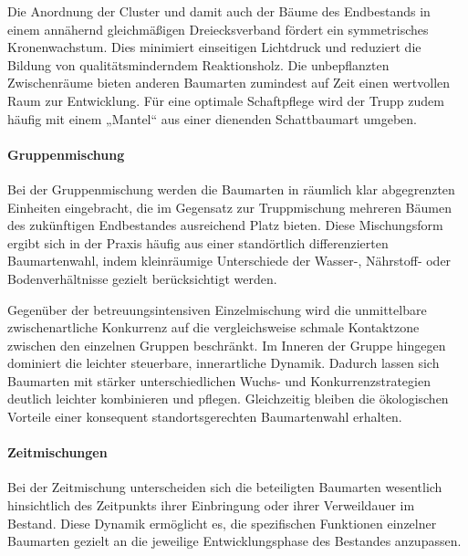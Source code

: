 \documentclass[twocolumn, bibliography=totoc, abstract=true]{scrartcl}
\begin{document}
Die Anordnung der Cluster und damit auch der Bäume des Endbestands in einem annähernd gleichmäßigen Dreiecksverband fördert ein symmetrisches Kronenwachstum. Dies minimiert einseitigen Lichtdruck und reduziert die Bildung von qualitätsminderndem Reaktionsholz. Die unbepflanzten Zwischenräume bieten anderen Baumarten zumindest auf Zeit einen wertvollen Raum zur Entwicklung. Für eine optimale Schaftpflege wird der Trupp zudem häufig mit einem „Mantel“ aus einer dienenden Schattbaumart umgeben.

\paragraph{Gruppenmischung}

Bei der Gruppenmischung werden die Baumarten in räumlich klar abgegrenzten Einheiten eingebracht, die im Gegensatz zur Truppmischung mehreren Bäumen des zukünftigen Endbestandes ausreichend Platz bieten. Diese Mischungsform ergibt sich in der Praxis häufig aus einer standörtlich differenzierten Baumartenwahl, indem kleinräumige Unterschiede der Wasser-, Nährstoff- oder Bodenverhältnisse gezielt berücksichtigt werden.

Gegenüber der betreuungsintensiven Einzelmischung wird die unmittelbare zwischenartliche Konkurrenz auf die vergleichsweise schmale Kontaktzone zwischen den einzelnen Gruppen beschränkt. Im Inneren der Gruppe hingegen dominiert die leichter steuerbare, innerartliche Dynamik. Dadurch lassen sich Baumarten mit stärker unterschiedlichen Wuchs- und Konkurrenzstrategien deutlich leichter kombinieren und pflegen. Gleichzeitig bleiben die ökologischen Vorteile einer konsequent standortsgerechten Baumartenwahl erhalten.

\paragraph{Zeitmischungen}

Bei der Zeitmischung unterscheiden sich die beteiligten Baumarten wesentlich hinsichtlich des Zeitpunkts ihrer Einbringung oder ihrer Verweildauer im Bestand. Diese Dynamik ermöglicht es, die spezifischen Funktionen einzelner Baumarten gezielt an die jeweilige Entwicklungsphase des Bestandes anzupassen. 
\end{document}
